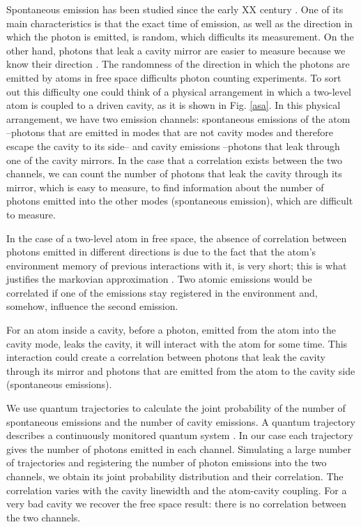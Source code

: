 \documentclass[%
 reprint,
 amsmath,amssymb,
 aps, 
]{revtex4-1}
\begin{document}
Spontaneous emission has been studied since the early XX century
\cite{10.2307/94746, 1917PhyZ...18..121E}. One of its main
characteristics is that the exact time of emission, as well as the
direction in which the photon is emitted, is random, which difficults
its measurement. On the other hand, photons that leak a cavity mirror
are easier to measure because we know their direction \cite{326305,
  doi:10.1063/1.113345}. The randomness of the direction in which the
photons are emitted by atoms in free space difficults photon counting
experiments. To sort out this difficulty one could think of a physical
arrangement in which a two-level atom is coupled to a driven cavity,
as it is shown in Fig. \ref{asa}. In this physical arrangement, we
have two emission channels: spontaneous emissions of the atom
--photons that are emitted in modes that are not cavity modes and
therefore escape the cavity to its side-- and cavity emissions
--photons that leak through one of the cavity mirrors. In the case
that a correlation exists between the two channels, we can count the
number of photons that leak the cavity through its mirror, which is
easy to measure, to find information about the number of photons
emitted into the other modes (spontaneous emission), which are
difficult to measure.

In the case of a two-level atom in free space, the absence of
correlation between photons emitted in different directions is due to
the fact that the atom's environment memory of previous interactions
with it, is very short; this is what justifies the markovian
approximation \cite{daley2014quantum}. Two atomic emissions would be
correlated if one of the emissions stay registered in the environment
and, somehow, influence the second emission.

For an atom inside a cavity, before a photon, emitted from the atom
into the cavity mode, leaks the cavity, it will interact with the atom
for some time. This interaction could create a correlation between
photons that leak the cavity through its mirror and photons that are
emitted from the atom to the cavity side (spontaneous emissions).

We use quantum trajectories to calculate the joint probability of the
number of spontaneous emissions and the number of cavity emissions. A
quantum trajectory describes a continuously monitored quantum system
\cite{Carmichael1993Open}. In our case each trajectory gives the
number of photons emitted in each channel. Simulating a large number
of trajectories and registering the number of photon emissions into
the two channels, we obtain its joint probability distribution and
their correlation. The correlation varies with the cavity linewidth
and the atom-cavity coupling. For a very bad cavity we recover the
free space result: there is no correlation between the two channels.
\end{document}
